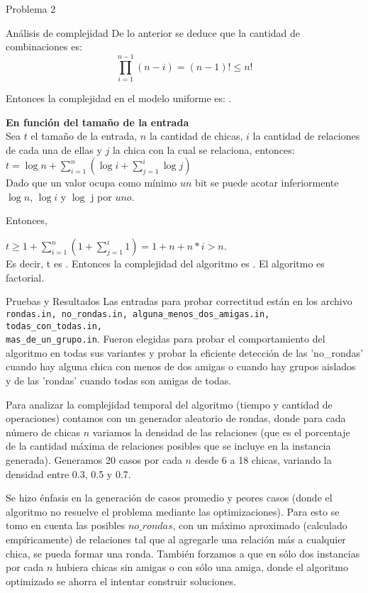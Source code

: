 \begin{section}{Problema 2}
\begin{subsection}{Análisis de complejidad}
			De lo anterior se deduce que la cantidad de combinaciones es: $$\displaystyle\prod_{i=1}^{n-1} (n-i) = (n-1)! \leq n!$$

			Entonces la complejidad en el modelo uniforme es:  .\VSP
		
			\noindent\textbf{En función del tamaño de la entrada}\\

				Sea $t$ el tamaño de la entrada, $n$ la cantidad de chicas, $i$ la cantidad de relaciones de cada una de ellas y $j$ la chica con la cual se relaciona, entonces:\\
				
				$t=\log n + \sum_{i=1}^n (\log i + \sum_{j=1}^i \log j)$\\
				
				Dado que un valor ocupa como mínimo $un$ bit se puede acotar inferiormente $\log n$, $\log i$ y $\log$ j por $uno$.
				
				Entonces,
				
				$t \geq 1 + \sum_{i=1}^n (1 + \sum_{j=1}^i 1)=1 + n + n*i > n$.\\
				
				
				Es decir, t es . Entonces la complejidad del algoritmo es . El algoritmo es factorial.
	\end{subsection}

	\begin{subsection}{Pruebas y Resultados}
		Las entradas para probar correctitud están en los archivo \texttt{rondas.in, no\_rondas.in, alguna\_menos\_dos\_amigas.in, todas\_con\_todas.in, \\
		mas\_de\_un\_grupo.in}.
		Fueron elegidas para probar el comportamiento del algoritmo en todas sus variantes y probar la eficiente detección de las 'no\_rondas' cuando hay alguna chica con menos de dos amigas o cuando hay grupos aislados y de las 'rondas' cuando todas son amigas de todas.
		
		Para analizar la complejidad temporal del algoritmo (tiempo y cantidad de operaciones) contamos con un generador aleatorio de rondas, donde para cada número de chicas $n$ variamos la densidad de las relaciones (que es el porcentaje de la cantidad máxima de relaciones posibles que se incluye en la instancia generada). Generamos 20 casos por cada $n$ desde 6 a 18 chicas, variando la densidad entre 0.3, 0.5 y 0.7.

		 Se hizo énfasis en la generación de casos promedio y peores casos (donde el algoritmo no resuelve el problema mediante las optimizaciones). Para esto se tomo en cuenta las posibles $no\_rondas$, con un máximo aproximado (calculado empíricamente) de relaciones tal que al agregarle una relación más a cualquier chica, se pueda formar una ronda. También forzamos a que en sólo dos instancias por cada $n$ hubiera chicas sin amigas o con sólo una amiga, donde el algoritmo optimizado se ahorra el intentar construir soluciones.
		

\end{subsection}
\end{section}
